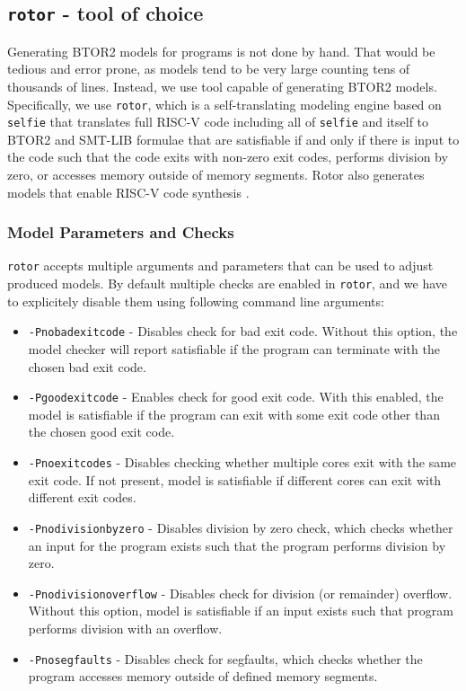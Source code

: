 \documentclass[12pt]{article}
\begin{document}
\subsection{\texttt{rotor} - tool of choice}

Generating BTOR2 models for programs is not done by hand. That would be tedious
and error prone, as models tend to be very large counting tens of thousands of
lines. Instead, we use tool capable of generating BTOR2 models. Specifically,
we use \texttt{rotor}, which is a self-translating modeling engine based on
\texttt{selfie} that translates full RISC-V code including all of
\texttt{selfie} and itself to BTOR2 and SMT-LIB formulae that are satisfiable
if and only if there is input to the code such that the code exits with
non-zero exit codes, performs division by zero, or accesses memory outside of
memory segments. Rotor also generates models that enable RISC-V code synthesis
\cite{gh:rotor}.

\subsubsection{Model Parameters and Checks}

\texttt{rotor} accepts multiple arguments and parameters that can be used to
adjust produced models. By default multiple checks are enabled in
\texttt{rotor}, and we have to explicitely disable them using following command
line arguments:

\begin{itemize}
    \item \texttt{-Pnobadexitcode} - Disables check for bad exit code. Without
        this option, the model checker will report satisfiable if the program
        can terminate with the chosen bad exit code.
    \item \texttt{-Pgoodexitcode} - Enables check for good exit code. With this
        enabled, the model is satisfiable if the program can exit with some 
        exit code other than the chosen good exit code.
    \item \texttt{-Pnoexitcodes} - Disables checking whether multiple cores
        exit with the same exit code. If not present, model is satisfiable if
        different cores can exit with different exit codes.
    \item \texttt{-Pnodivisionbyzero} - Disables division by zero check, which
        checks whether an input for the program exists such that the program
        performs division by zero.
    \item \texttt{-Pnodivisionoverflow} - Disables check for division (or
        remainder) overflow. Without this option, model is satisfiable if an
        input exists such that program performs division with an overflow.
    \item \texttt{-Pnosegfaults} - Disables check for segfaults, which checks
        whether the program accesses memory outside of defined memory segments.
\end{itemize}
\end{document}
